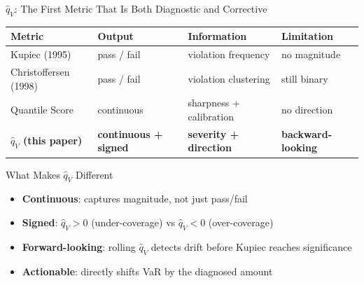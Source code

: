\documentclass[9pt, aspectratio=169, t]{beamer}
\newcommand{\qV}{\hat{q}_V}
\begin{document}
\begin{frame}{$\qV$: The First Metric That Is Both Diagnostic and Corrective}
	\vspace{-0.2cm}
	{\small
	\begin{center}
	\begin{tabular}{@{}llll@{}}
	\toprule
	\textbf{Metric} & \textbf{Output} & \textbf{Information} & \textbf{Limitation} \\
	\midrule
	Kupiec (1995) & pass / fail & violation frequency & no magnitude \\
	Christoffersen (1998) & pass / fail & violation clustering & still binary \\
	Quantile Score & continuous & sharpness + calibration & no direction \\
	\midrule
	\textbf{$\qV$ (this paper)} & \textbf{continuous + signed} & \textbf{severity + direction} & \textbf{backward-looking} \\
	\bottomrule
	\end{tabular}
	\end{center}
	\vspace{2mm}
	\begin{exampleblock}{What Makes $\qV$ Different}
		\begin{itemize}\setlength{\itemsep}{2pt}
			\item \textbf{Continuous}: captures magnitude, not just pass/fail
			\item \textbf{Signed}: $\qV > 0$ (under-coverage) vs $\qV < 0$ (over-coverage)
			\item \textbf{Forward-looking}: rolling $\qV$ detects drift before Kupiec reaches significance
			\item \textbf{Actionable}: directly shifts VaR by the diagnosed amount
		\end{itemize}
	\end{exampleblock}
	}
\end{frame}
\end{document}
